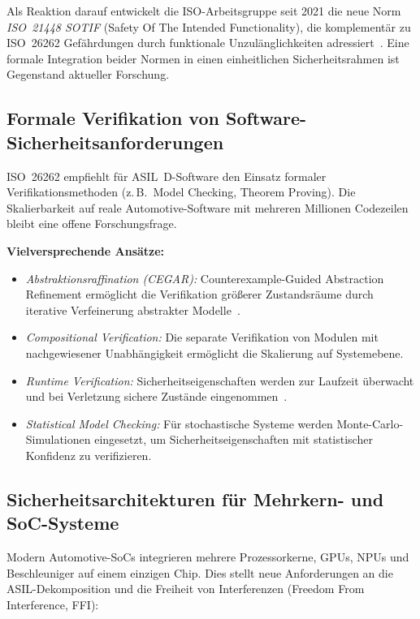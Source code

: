 ﻿\documentclass[a4paper,12pt]{article}
\theoremstyle{definition}
\begin{document}
Als Reaktion darauf entwickelt die ISO-Arbeitsgruppe seit 2021 die
neue Norm \emph{ISO~21448 SOTIF} (Safety Of The Intended
Functionality), die komplementär zu ISO~26262 Gefährdungen durch
funktionale Unzulänglichkeiten adressiert~\cite{iso21448_2022}.
Eine formale Integration beider Normen in einen einheitlichen
Sicherheitsrahmen ist Gegenstand aktueller Forschung.

\subsection{Formale Verifikation von Software-Sicherheitsanforderungen}

ISO~26262 empfiehlt für ASIL~D-Software den Einsatz formaler
Verifikationsmethoden (z.\,B.\ Model Checking, Theorem Proving).
Die Skalierbarkeit auf reale Automotive-Software mit mehreren
Millionen Codezeilen bleibt eine offene Forschungsfrage.

\textbf{Vielversprechende Ansätze:}
\begin{itemize}
  \item \emph{Abstraktionsraffination (CEGAR):}
        Counterexample-Guided Abstraction Refinement ermöglicht
        die Verifikation größerer Zustandsräume durch iterative
        Verfeinerung abstrakter Modelle~\cite{clarke_2003}.
  \item \emph{Compositional Verification:}
        Die separate Verifikation von Modulen mit nachgewiesener
        Unabhängigkeit ermöglicht die Skalierung auf Systemebene.
  \item \emph{Runtime Verification:}
        Sicherheitseigenschaften werden zur Laufzeit überwacht
        und bei Verletzung sichere Zustände eingenommen~\cite{leucker_2009}.
  \item \emph{Statistical Model Checking:}
        Für stochastische Systeme werden Monte-Carlo-Simulationen
        eingesetzt, um Sicherheitseigenschaften mit statistischer
        Konfidenz zu verifizieren.
\end{itemize}

\subsection{Sicherheitsarchitekturen für Mehrkern- und SoC-Systeme}

Modern Automotive-SoCs integrieren mehrere Prozessorkerne, GPUs,
NPUs und Beschleuniger auf einem einzigen Chip. Dies stellt neue
Anforderungen an die ASIL-Dekomposition und die Freiheit von
Interferenzen (Freedom From Interference, FFI):
\end{document}
